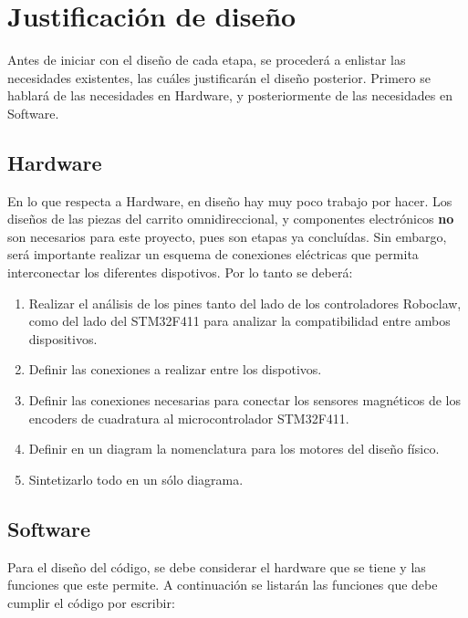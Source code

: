\section{Justificación de diseño}

Antes de iniciar con el diseño de cada etapa, se procederá a enlistar las necesidades existentes, las cuáles justificarán el diseño posterior. Primero se hablará de las necesidades en Hardware, y posteriormente de las necesidades en Software.

\subsection{Hardware}

En lo que respecta a Hardware, en diseño hay muy poco trabajo por hacer. Los diseños de las piezas del carrito omnidireccional, y componentes electrónicos \textbf{no} son necesarios para este proyecto, pues son etapas ya concluídas. Sin embargo, será importante realizar un esquema de conexiones eléctricas que permita interconectar los diferentes dispotivos. Por lo tanto se deberá:

\begin{enumerate}
\item Realizar el análisis de los pines tanto del lado de los controladores Roboclaw, como del lado del STM32F411 para analizar la compatibilidad entre ambos dispositivos.
\item Definir las conexiones a realizar entre los dispotivos.
\item Definir las conexiones necesarias para conectar los sensores magnéticos de los encoders de cuadratura al microcontrolador STM32F411.
\item Definir en un diagram la nomenclatura para los motores del diseño físico.
\item Sintetizarlo todo en un sólo diagrama.
\end{enumerate}

\subsection{Software}

Para el diseño del código, se debe considerar el hardware que se tiene y las funciones que este permite. A continuación se listarán las funciones que debe cumplir el código por escribir:

